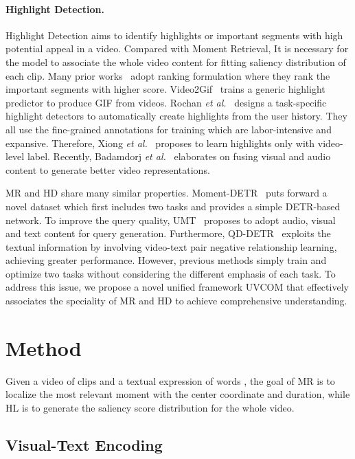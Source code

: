 \documentclass[10pt,twocolumn,letterpaper]{article}
\begin{document}
\vspace{-10pt} 
\paragraph{Highlight Detection.} Highlight Detection aims to identify highlights or important segments with high potential appeal in a video. Compared with Moment Retrieval, It is necessary for the model to associate the whole video content for fitting saliency distribution of each clip. Many prior works~\cite{Yao_2016, video2gif, Yao_2016, LIM-s, cvs} adopt ranking formulation where they rank the important segments with higher score. Video2Gif~\cite{video2gif} trains a generic highlight predictor to produce GIF from videos. Rochan \textit{et al.}~\cite{Rochan_2020} designs a task-specific highlight detectors to automatically create highlights from the user history. They all use the fine-grained annotations for training which are labor-intensive and expansive. Therefore, Xiong \textit{et al.}~\cite{LIM-s} proposes to learn highlights only with video-level label. Recently, Badamdorj \textit{et al.}~\cite{joint_va} elaborates on fusing visual and audio content to generate better video representations.

MR and HD share many similar properties. Moment-DETR~\cite{momentdetr} puts forward a novel dataset which first includes two tasks and provides a simple DETR-based~\cite{detr} network. To improve the query quality, UMT~\cite{umt} proposes to adopt audio, visual and text content for query generation. Furthermore, QD-DETR~\cite{qddetr} exploits the textual information by involving video-text pair negative relationship learning, achieving greater performance. However, previous methods simply train and optimize two tasks without considering the different emphasis of each task. To address this issue, we propose a novel unified framework UVCOM that effectively associates the speciality of MR and HD to achieve comprehensive understanding. 
 \section{Method}

Given a video of  clips  and a textual expression of  words , the goal of MR is to localize the most relevant moment with the center coordinate and duration, while HL is to generate the saliency score distribution for the whole video.

\subsection{Visual-Text Encoding}
\label{sec:visual-text encoding}
\end{document}
